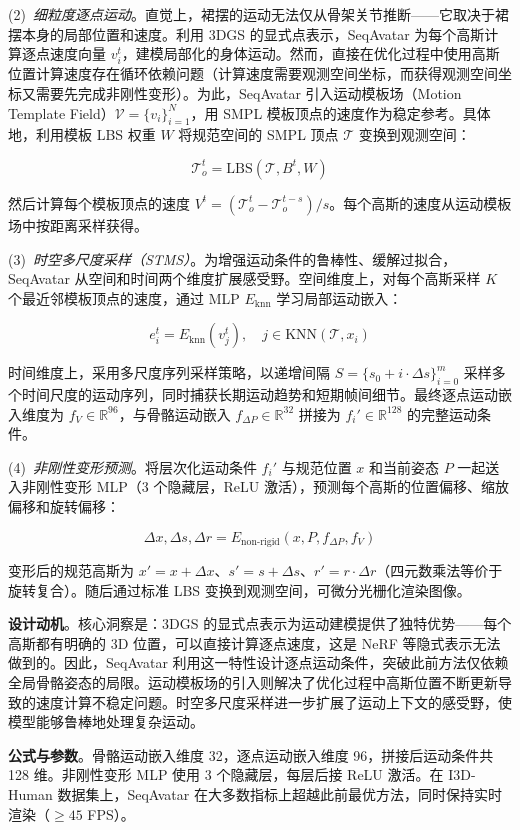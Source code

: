 (2)~\textit{细粒度逐点运动}。直觉上，裙摆的运动无法仅从骨架关节推断——它取决于裙摆本身的局部位置和速度。利用 3DGS 的显式点表示，SeqAvatar 为每个高斯计算逐点速度向量 $v_i^t$，建模局部化的身体运动。然而，直接在优化过程中使用高斯位置计算速度存在循环依赖问题（计算速度需要观测空间坐标，而获得观测空间坐标又需要先完成非刚性变形）。为此，SeqAvatar 引入运动模板场（Motion Template Field）$\mathcal{V} = \{v_i\}_{i=1}^{N}$，用 SMPL 模板顶点的速度作为稳定参考。具体地，利用模板 LBS 权重 $W$ 将规范空间的 SMPL 顶点 $\mathcal{T}$ 变换到观测空间：

\[
\mathcal{T}_o^t = \mathrm{LBS}(\mathcal{T}, B^t, W)
\]

然后计算每个模板顶点的速度 $V^t = (\mathcal{T}_o^t - \mathcal{T}_o^{t-s})/s$。每个高斯的速度从运动模板场中按距离采样获得。

(3)~\textit{时空多尺度采样（STMS）}。为增强运动条件的鲁棒性、缓解过拟合，SeqAvatar 从空间和时间两个维度扩展感受野。空间维度上，对每个高斯采样 $K$ 个最近邻模板顶点的速度，通过 MLP $E_{\text{knn}}$ 学习局部运动嵌入：

\[
e_i^t = E_{\text{knn}}(v_j^t), \quad j \in \mathrm{KNN}(\mathcal{T}, x_i)
\]

时间维度上，采用多尺度序列采样策略，以递增间隔 $S = \{s_0 + i \cdot \Delta s\}_{i=0}^{m}$ 采样多个时间尺度的运动序列，同时捕获长期运动趋势和短期帧间细节。最终逐点运动嵌入维度为 $f_V \in \mathbb{R}^{96}$，与骨骼运动嵌入 $f_{\Delta P} \in \mathbb{R}^{32}$ 拼接为 $f_i' \in \mathbb{R}^{128}$ 的完整运动条件。

(4)~\textit{非刚性变形预测}。将层次化运动条件 $f_i'$ 与规范位置 $x$ 和当前姿态 $P$ 一起送入非刚性变形 MLP（3 个隐藏层，ReLU 激活），预测每个高斯的位置偏移、缩放偏移和旋转偏移：

\[
\Delta x, \Delta s, \Delta r = E_{\text{non-rigid}}(x, P, f_{\Delta P}, f_V)
\]

变形后的规范高斯为 $x' = x + \Delta x$、$s' = s + \Delta s$、$r' = r \cdot \Delta r$（四元数乘法等价于旋转复合）。随后通过标准 LBS 变换到观测空间，可微分光栅化渲染图像。

\textbf{设计动机}。核心洞察是：3DGS 的显式点表示为运动建模提供了独特优势——每个高斯都有明确的 3D 位置，可以直接计算逐点速度，这是 NeRF 等隐式表示无法做到的。因此，SeqAvatar 利用这一特性设计逐点运动条件，突破此前方法仅依赖全局骨骼姿态的局限。运动模板场的引入则解决了优化过程中高斯位置不断更新导致的速度计算不稳定问题。时空多尺度采样进一步扩展了运动上下文的感受野，使模型能够鲁棒地处理复杂运动。

\textbf{公式与参数}。骨骼运动嵌入维度 32，逐点运动嵌入维度 96，拼接后运动条件共 128 维。非刚性变形 MLP 使用 3 个隐藏层，每层后接 ReLU 激活。在 I3D-Human 数据集上，SeqAvatar 在大多数指标上超越此前最优方法，同时保持实时渲染（$\geq 45$ FPS）。

